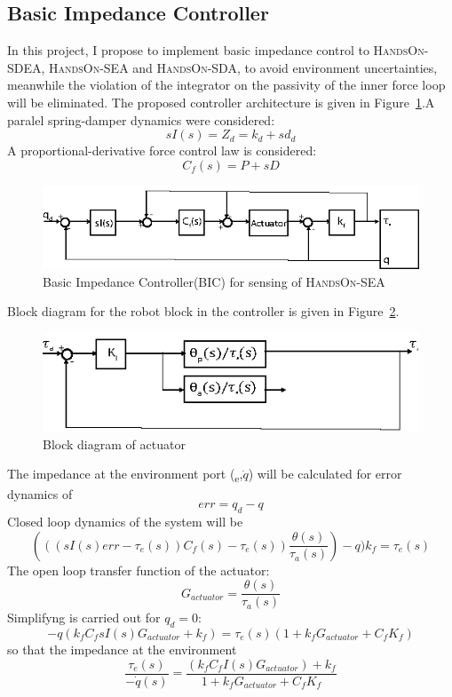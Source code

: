 \documentclass[a4paper,12pt]{article}
\begin{document}
\subsection{Basic Impedance Controller}
In this project, I propose to implement basic impedance control to \textsc{HandsOn-SDEA}, \textsc{HandsOn-SEA} and \textsc{HandsOn-SDA}, to avoid environment uncertainties, meanwhile the violation of the integrator on the passivity of the inner force loop will be eliminated\cite{pratt}. 
The proposed controller architecture is given in Figure~\ref{fig:bic}.A paralel spring-damper dynamics were considered:
\begin{equation}
sI(s)=Z_d=k_d+sd_d  
\end{equation}
A proportional-derivative force control law is considered:
\begin{equation}
C_f(s)=P+sD  
\end{equation}
\begin{figure}[h]
\centering
\includegraphics[scale=2]{bic.eps}
\caption{Basic Impedance Controller(BIC) for sensing of \textsc{HandsOn-SEA}}
\label{fig:bic}
\end{figure}
Block diagram for the robot block in the controller is given in Figure~\ref{fig:robot}.
\begin{figure}[h]
\centering
\includegraphics[scale=2]{robotv2.eps}
\caption{Block diagram of actuator}
\label{fig:robot}
\end{figure}
The impedance at the environment port (\texttau  \textsubscript{e},$\dot{q}$) will be calculated for error dynamics of
\begin{equation}
err=q_d-q
\end{equation}
Closed loop dynamics of the system will be
\begin{equation}
(((sI(s)err-\tau_{e}(s))C_f(s)-\tau_{e}(s))\frac{\theta(s)}{\tau_a(s)})-q)k_f=\tau_{e}(s)
\end{equation}
The open loop transfer function of the actuator:
\begin{equation}
G_{actuator}=\frac{\theta(s)}{\tau_a(s)}
\end{equation}
Simplifyng is carried out for $q_d=0$:
\begin{equation}
-q(k_fC_fsI(s)G_{actuator}+k_f)=\tau_{e}(s)(1+k_fG_{actuator}+C_fK_f)
\end{equation}
so that the impedance at the environment
\begin{equation}
\frac{\tau_e(s)}{-\Dot{q}(s)}=\frac{(k_fC_fI(s)G_{actuator})+k_f}{1+k_fG_{actuator}+C_fK_f}    
\end{equation}
\end{document}
